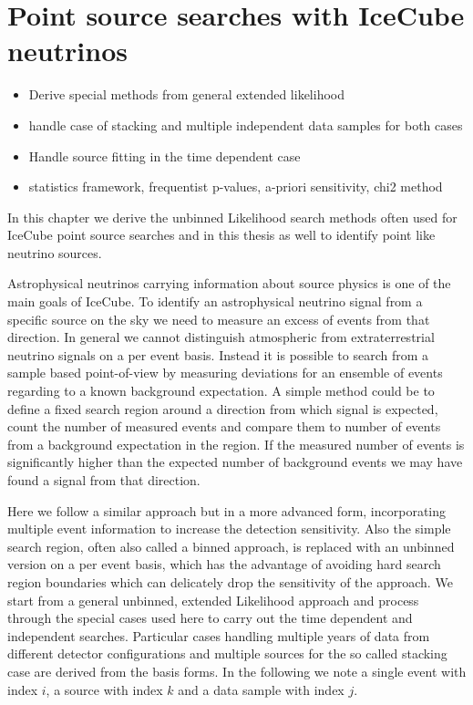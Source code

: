 \chapter{Point source searches with IceCube neutrinos}

\begin{itemize}
  \item Derive special methods from general extended likelihood
  \item handle case of stacking and multiple independent data samples for both cases
  \item Handle source fitting in the time dependent case
  \item statistics framework, frequentist p-values, a-priori sensitivity, chi2 method
\end{itemize}

In this chapter we derive the unbinned Likelihood search methods often used for IceCube point source searches and in this thesis as well to identify point like neutrino sources.

Astrophysical neutrinos carrying information about source physics is one of the main goals of IceCube.
To identify an astrophysical neutrino signal from a specific source on the sky we need to measure an excess of events from that direction.
In general we cannot distinguish atmospheric from extraterrestrial neutrino signals on a per event basis.
Instead it is possible to search from a sample based point-of-view by measuring deviations for an ensemble of events regarding to a known background expectation.
A simple method could be to define a fixed search region around a direction from which signal is expected, count the number of measured events and compare them to number of events from a background expectation in the region.
If the measured number of events is significantly higher than the expected number of background events we may have found a signal from that direction.

Here we follow a similar approach but in a more advanced form, incorporating multiple event information to increase the detection sensitivity.
Also the simple search region, often also called a binned approach, is replaced with an unbinned version on a per event basis, which has the advantage of avoiding hard search region boundaries which can delicately drop the sensitivity of the approach.
We start from a general unbinned, extended Likelihood approach and process through the special cases used here to carry out the time dependent and independent searches.
Particular cases handling multiple years of data from different detector configurations and multiple sources for the so called stacking case are derived from the basis forms.
In the following we note a single event with index $i$, a source with index $k$ and a data sample with index $j$.

